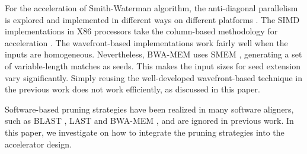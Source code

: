 For the acceleration of Smith-Waterman algorithm, 
the anti-diagonal parallelism is explored and implemented in different ways on different platforms \cite{Wozniak1997}\cite{Preusser2012}\cite{RaceLogic}\cite{Zhang2007}\cite{Yu2005}\cite{Kim2011}\cite{Lam2013}. 
The SIMD implementations in X86 processors take the column-based methodology for acceleration \cite{Farrar2007}\cite{Rognes2011}.
The wavefront-based implementations work fairly well when the inputs are homogeneous. 
Nevertheless, BWA-MEM \cite{BWA-MEM} uses SMEM \cite{Heng2012}, generating a set of variable-length matches as seeds.
This makes the input sizes for seed extension vary significantly. 
Simply reusing the well-developed wavefront-based technique in the previous work \cite{Wozniak1997}\cite{Preusser2012}\cite{RaceLogic}\cite{Zhang2007}\cite{Yu2005}\cite{Kim2011}\cite{Lam2013} 
does not work efficiently, as discussed in this paper.

Software-based pruning strategies have been realized in many software aligners, such as BLAST \cite{BLAST1990}, LAST \cite{LAST} and BWA-MEM \cite{BWA-MEM}, and are ignored in previous work. In this paper, we investigate on how to integrate the pruning strategies into the accelerator design.
